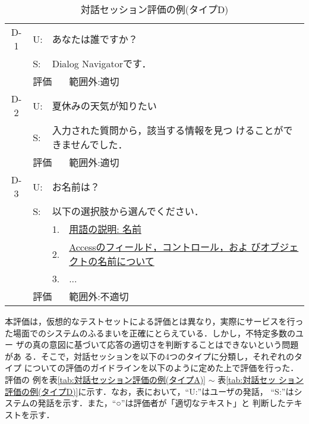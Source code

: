 \begin{table}
 \caption{対話セッション評価の例(タイプD)} \label{tab:対話セッション評価の例(タイプD)}
 \begin{center} \footnotesize
  \begin{tabular}{c|llp{10cm}} \hline
   D-1 & U: & \multicolumn{2}{l}{あなたは誰ですか？} \\
       & S: & \multicolumn{2}{l}{Dialog Navigatorです．} \\ \cline{2-4}
       & \multicolumn{2}{l}{評価} & 範囲外:適切 \\ \hline

   D-2 & U: & \multicolumn{2}{l}{夏休みの天気が知りたい} \\
       & S: & \multicolumn{2}{l}{入力された質問から，該当する情報を見つ
       けることができませんでした．} \\ \cline{2-4}
       & \multicolumn{2}{l}{評価} & 範囲外:適切 \\ \hline

   D-3 & U: & \multicolumn{2}{l}{お名前は？} \\
       & S: & \multicolumn{2}{l}{以下の選択肢から選んでください．} \\
       &    & 1.    & \underline{用語の説明: 名前} \\
       &    & 2.    & \underline{Accessのフィールド，コントロール，およ
       びオブジェクトの名前について} \\
       &    & 3.    & ... \\ \cline{2-4}
       & \multicolumn{2}{l}{評価} & 範囲外:不適切 \\ \hline

  \end{tabular}

 \end{center}
\end{table}



本評価は，仮想的なテストセットによる評価とは異なり，実際にサービスを行っ
た場面でのシステムのふるまいを正確にとらえている．しかし，不特定多数のユー
ザの真の意図に基づいて応答の適切さを判断することはできないという問題があ
る．そこで，対話セッションを以下の4つのタイプに分類し，それぞれのタイプ
についての評価のガイドラインを以下のように定めた上で評価を行った．評価の
例を表\ref{tab:対話セッション評価の例(タイプA)} $\sim$ 表\ref{tab:対話セッ
ション評価の例(タイプD)}に示す．なお，表において，``U:''はユーザの発話，
``S:''はシステムの発話を示す．また，``○''は評価者が「適切なテキスト」と
判断したテキストを示す．


